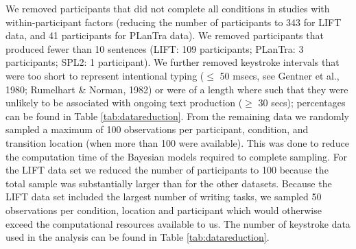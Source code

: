 \documentclass[
  man,floatsintext]{apa7}
\begin{document}
We removed participants that did not complete all conditions in studies with within-participant factors (reducing the number of participants to 343 for LIFT data, and 41 participants for PLanTra data). We removed participants that produced fewer than 10 sentences (LIFT: 109 participants; PLanTra: 3 participants; SPL2: 1 participant). We further removed keystroke intervals that were too short to represent intentional typing (\(\le\) 50 msecs, see Gentner et al., 1980; Rumelhart \& Norman, 1982) or were of a length where such that they were unlikely to be associated with ongoing text production (\(\ge\) 30 secs); percentages can be found in Table \ref{tab:datareduction}. From the remaining data we randomly sampled a maximum of 100 observations per participant, condition, and transition location (when more than 100 were available). This was done to reduce the computation time of the Bayesian models required to complete sampling. For the LIFT data set we reduced the number of participants to 100 because the total sample was substantially larger than for the other datasets. Because the LIFT data set included the largest number of writing tasks, we sampled 50 observations per condition, location and participant which would otherwise exceed the computational resources available to us. The number of keystroke data used in the analysis can be found in Table \ref{tab:datareduction}.
\end{document}
